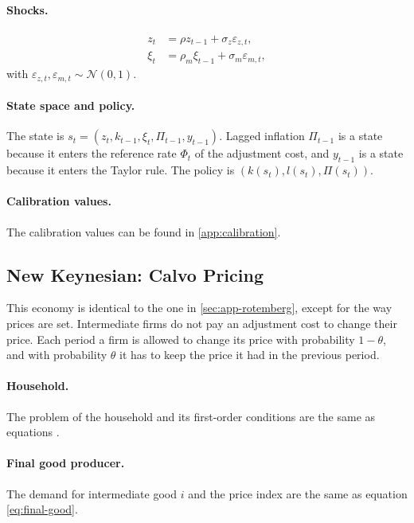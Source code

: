 \documentclass[12pt]{article}
\begin{document}
\paragraph{Shocks.}
\begin{align}
z_t &= \rho z_{t-1} + \sigma_z \varepsilon_{z,t}, \label{eq:shock-z} \\
\xi_t &= \rho_m \xi_{t-1} + \sigma_m \varepsilon_{m,t}, \label{eq:shock-m}
\end{align}
with $\varepsilon_{z,t}, \varepsilon_{m,t} \sim \mathcal{N}(0,1)$.

\paragraph{State space and policy.} The state is $s_t = (z_t, k_{t-1}, \xi_t, \Pi_{t-1}, y_{t-1})$. Lagged inflation $\Pi_{t-1}$ is a state because it enters the reference rate $\Phi_t$ of the adjustment cost, and $y_{t-1}$ is a state because it enters the Taylor rule. The policy is $\left(k(s_t), l(s_t), \Pi(s_t)\right)$.

\paragraph{Calibration values.} The calibration values can be found in \cref{app:calibration}.

\subsection{New Keynesian: Calvo Pricing}\label{sec:app-calvo}

This economy is identical to the one in \cref{sec:app-rotemberg}, except for the way prices are set. Intermediate firms do not pay an adjustment cost to change their price. Each period a firm is allowed to change its price with probability $1-\theta$, and with probability $\theta$ it has to keep the price it had in the previous period.

\paragraph{Household.} The problem of the household and its first-order conditions are the same as equations .

\paragraph{Final good producer.} The demand for intermediate good $i$ and the price index are the same as equation \cref{eq:final-good}.
\end{document}
